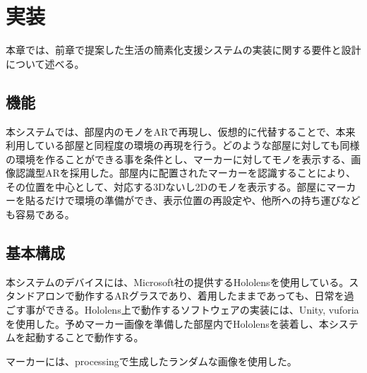 
\chapter{実装}
\label{chap:implementation}

本章では、前章で提案した生活の簡素化支援システムの実装に関する要件と設計について述べる。

\newpage

\section{機能}
本システムでは、部屋内のモノをARで再現し、仮想的に代替することで、本来利用している部屋と同程度の環境の再現を行う。どのような部屋に対しても同様の環境を作ることができる事を条件とし、マーカーに対してモノを表示する、画像認識型ARを採用した。部屋内に配置されたマーカーを認識することにより、その位置を中心として、対応する3Dないし2Dのモノを表示する。部屋にマーカーを貼るだけで環境の準備ができ、表示位置の再設定や、他所への持ち運びなども容易である。

\section{基本構成}

本システムのデバイスには、Microsoft社の提供するHololensを使用している。スタンドアロンで動作するARグラスであり、着用したままであっても、日常を過ごす事ができる。Hololens上で動作するソフトウェアの実装には、Unity\cite{unity}, vuforia\cite{vuforia}を使用した。予めマーカー画像を準備した部屋内でHololensを装着し、本システムを起動することで動作する。

マーカーには、processingで生成したランダムな画像を使用した。

